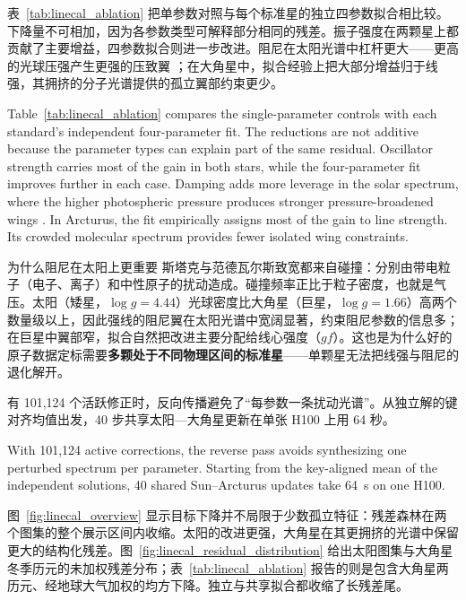表~\ref{tab:linecal_ablation} 把单参数对照与每个标准星的独立四参数拟合相比较。下降量不可相加，因为各参数类型可解释部分相同的残差。振子强度在两颗星上都贡献了主要增益，四参数拟合则进一步改进。阻尼在太阳光谱中杠杆更大——更高的光球压强产生更强的压致翼 \citep{Barklem2000,Gray2005}；在大角星中，拟合经验上把大部分增益归于线强，其拥挤的分子光谱提供的孤立翼部约束更少。

\begin{EN}
Table~\ref{tab:linecal_ablation} compares the single-parameter controls with
each standard's independent four-parameter fit. The reductions are not additive because
the parameter types can explain part of the same residual. Oscillator strength
carries most of the gain in both stars, while the four-parameter fit improves
further in each case. Damping adds more leverage in the solar
spectrum, where the higher photospheric pressure produces stronger
pressure-broadened wings \citep{Barklem2000,Gray2005}. In Arcturus, the fit
empirically assigns most of the gain to line strength. Its crowded molecular
spectrum provides fewer isolated wing constraints.
\end{EN}

\begin{physbox}{为什么阻尼在太阳上更重要}
斯塔克与范德瓦尔斯致宽都来自碰撞：分别由带电粒子（电子、离子）和中性原子的扰动造成。碰撞频率正比于粒子密度，也就是气压。太阳（矮星，$\log g=4.44$）光球密度比大角星（巨星，$\log g=1.66$）高两个数量级以上，因此强线的阻尼翼在太阳光谱中宽阔显著，约束阻尼参数的信息多；在巨星中翼部窄，拟合自然把改进主要分配给线心强度（$gf$）。这也是为什么好的原子数据定标需要\textbf{多颗处于不同物理区间的标准星}——单颗星无法把线强与阻尼的退化解开。
\end{physbox}

有 101,124 个活跃修正时，反向传播避免了“每参数一条扰动光谱”。从独立解的键对齐均值出发，40 步共享太阳—大角星更新在单张 H100 上用 64 秒。

\begin{EN}
With 101,124 active corrections, the reverse pass avoids synthesizing one
perturbed spectrum per parameter. Starting from the key-aligned mean of the
independent solutions, 40 shared Sun--Arcturus updates take 64~s on one H100.
\end{EN}

图~\ref{fig:linecal_overview} 显示目标下降并不局限于少数孤立特征：残差森林在两个图集的整个展示区间内收缩。太阳的改进更强，大角星在其更拥挤的光谱中保留更大的结构化残差。图~\ref{fig:linecal_residual_distribution} 给出太阳图集与大角星冬季历元的未加权残差分布；表~\ref{tab:linecal_ablation} 报告的则是包含大角星两历元、经地球大气加权的均方下降。独立与共享拟合都收缩了长残差尾。

